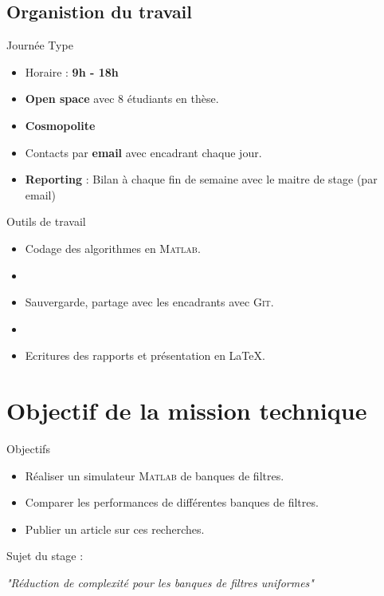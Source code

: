 \documentclass{beamer}
\begin{document}
\subsection{Organistion du travail}
\begin{frame}[c]{Journée Type}
  \begin{itemize}
    \item Horaire : \textbf{9h - 18h}
    \item \textbf{Open space} avec 8 étudiants en thèse.
    \item \textbf{Cosmopolite}
    \item Contacts par \textbf{email} avec encadrant chaque jour.
    \item \textbf{Reporting} : Bilan à chaque fin de semaine avec le maitre de stage (par email)
  \end{itemize}
\end{frame}

\begin{frame}{Outils de travail}
  \begin{itemize}
    \item Codage des algorithmes en \textsc{Matlab}.
    \item[]
    \item Sauvergarde, partage avec les encadrants avec \textsc{Git}.
    \item[]
    \item Ecritures des rapports et présentation en \LaTeX.
  \end{itemize}
\end{frame}

\section{Objectif de la mission technique}
\begin{frame}{Objectifs}
  \begin{itemize}
    \item Réaliser un simulateur \textsc{Matlab} de banques de filtres.
    \item Comparer les performances de différentes banques de filtres.
    \item Publier un article sur ces recherches.
  \end{itemize}
  Sujet du stage :\\
  \begin{center}
    \textit{"Réduction de complexité pour les banques de filtres uniformes"}
  \end{center}
\end{frame}
\end{document}
